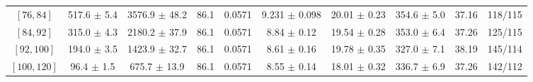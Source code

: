 \begin{tabular}{c||c|c|c|c|c|c|c||c|c}
$[76, 84]$ & 517.6 $\pm$ 5.4 & 3576.9 $\pm$ 48.2 & 86.1 & 0.0571 & 9.231 $\pm$ 0.098 & 20.01 $\pm$ 0.23 & 354.6 $\pm$ 5.0 & 37.16 & 118/115\\
$[84, 92]$ & 315.0 $\pm$ 4.3 & 2180.2 $\pm$ 37.9 & 86.1 & 0.0571 & 8.84 $\pm$ 0.12 & 19.54 $\pm$ 0.28 & 353.0 $\pm$ 6.4 & 37.26 & 125/115\\
$[92, 100]$ & 194.0 $\pm$ 3.5 & 1423.9 $\pm$ 32.7 & 86.1 & 0.0571 & 8.61 $\pm$ 0.16 & 19.78 $\pm$ 0.35 & 327.0 $\pm$ 7.1 & 38.19 & 145/114\\
$[100, 120]$ & 96.4 $\pm$ 1.5 & 675.7 $\pm$ 13.9 & 86.1 & 0.0571 & 8.55 $\pm$ 0.14 & 18.01 $\pm$ 0.32 & 336.7 $\pm$ 6.9 & 37.26 & 142/112\\
\end{tabular}
